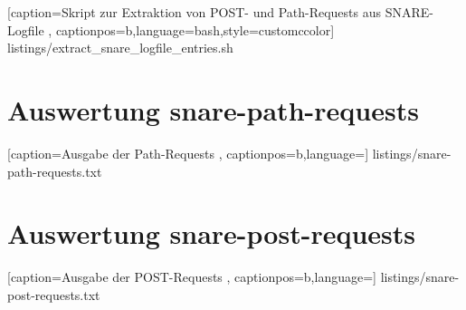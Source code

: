 
    [caption={Skript zur Extraktion von POST- und Path-Requests aus SNARE-Logfile}
       \label{lst:mitm_onmsg},
       captionpos=b,language=bash,style=customccolor]
 {listings/extract_snare_logfile_entries.sh}
 
\newpage
 
\section*{Auswertung snare-path-requests}
\label{app:Auswertung snare-path-requests}


    [caption={Ausgabe der Path-Requests}
       \label{lst:snare-path-requests},
       captionpos=b,language={}]
 {listings/snare-path-requests.txt} 
 
 
\newpage

\section*{Auswertung snare-post-requests}
\label{app:Auswertung snare-post-requests}
 
 
    [caption={Ausgabe der POST-Requests}
       \label{lst:snare-post-requests},
       captionpos=b,language={}]
 {listings/snare-post-requests.txt} 
 